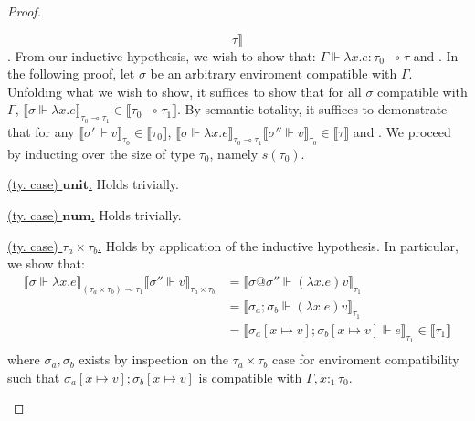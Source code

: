 \begin{proof}
\begin{description}
$$    \tau \rrbracket$$
    .
    From our inductive hypothesis, we wish to show that: $\Gamma \Vdash \lambda
    x . e : \tau_0 \multimap \tau$ and . 
    In the following proof, let $\sigma$ be an arbitrary enviroment compatible
    with $\Gamma$. Unfolding what we wish to show, it suffices to show that for
    all $\sigma$ compatible with $\Gamma$, $\llbracket \sigma \Vdash \lambda x .
    e \rrbracket_{\tau_0 \multimap \tau_1} \in \llbracket \tau_0 \multimap
    \tau_1 \rrbracket$. By semantic totality, it suffices to demonstrate that
    for any $\llbracket \sigma' \Vdash v \rrbracket_{\tau_0} \in \llbracket
    \tau_0 \rrbracket$, $\llbracket \sigma \Vdash \lambda x . e
    \rrbracket_{\tau_0 \multimap \tau_1} \llbracket \sigma'' \Vdash v
    \rrbracket_{\tau_0} \in \llbracket \tau \rrbracket$ and .
    We proceed by inducting over the size of type $\tau_0$, namely $s(\tau_0)$.
    \begin{description}
      \item{\underline{(ty. case) $\textbf{unit}$.}} Holds trivially.
      \item{\underline{(ty. case) $\textbf{num}$.}} Holds trivially.
      \item{\underline{(ty. case) $\tau_a \times \tau_b$.}} 
        Holds by application of the inductive hypothesis. 
        In particular, we show that:
        \begin{equation*}
          \begin{aligned}
            \llbracket \sigma \Vdash \lambda x . e \rrbracket_{(\tau_a \times
            \tau_b) \multimap \tau_1} \llbracket \sigma'' \Vdash v
            \rrbracket_{\tau_a \times \tau_b} &=
            \llbracket \sigma @ \sigma'' \Vdash (\lambda x . e) v
            \rrbracket_{\tau_1} \\
            &=
            \llbracket \sigma_a; \sigma_b \Vdash (\lambda x . e) v
            \rrbracket_{\tau_1} \\
            & =
            \llbracket \sigma_a[x \mapsto v]; \sigma_b[x \mapsto v] \Vdash e
            \rrbracket_{\tau_1} \in \llbracket \tau_1 \rrbracket \\
          \end{aligned}
        \end{equation*}
        where $\sigma_a, \sigma_b$ exists by inspection on the $\tau_a \times
        \tau_b$ case for enviroment compatibility such that $\sigma_a[x \mapsto
        v]; \sigma_b[x \mapsto v]$ is compatible with $\Gamma, x :_1 \tau_0$.

\end{description}
\end{description}
\end{proof}
